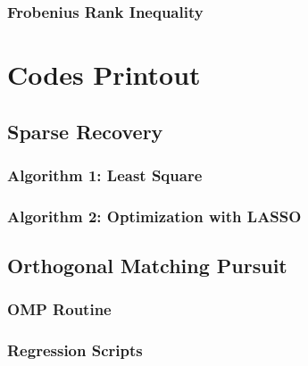 \documentclass[11pt,a4paper]{report}
\begin{document}
\subsection{Frobenius Rank Inequality}

\newpage
\appendix
\chapter{Codes Printout}

\section{Sparse Recovery}
\subsection{Algorithm 1: Least Square}

\newpage
\subsection{Algorithm 2: Optimization with LASSO}

\newpage

\section{Orthogonal Matching Pursuit}

\subsection{OMP Routine}


\newpage
\subsection{Regression Scripts}


\end{document}
